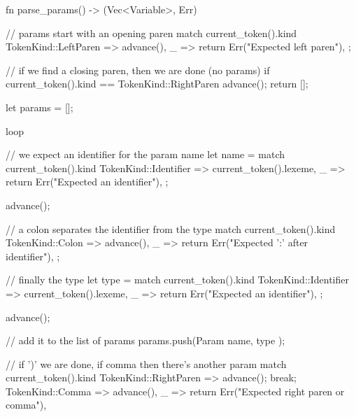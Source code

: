 ﻿\documentclass{article}
\begin{document}
                \begin{code}
                    fn parse_params() -> (Vec<Variable>, Err) {
                        // params start with an opening paren
                        match current_token().kind {
                            TokenKind::LeftParen => advance(),
                            _ => return Err("Expected left paren"),
                        };

                        // if we find a closing paren, then we are done (no params)
                        if current_token().kind == TokenKind::RightParen {
                            advance();
                            return [];
                        }

                        let params = [];

                        loop {
                            // we expect an identifier for the param name
                            let name = match current_token().kind {
                                TokenKind::Identifier => current_token().lexeme,
                                _ => return Err("Expected an identifier"),
                            };

                            advance();

                            // a colon separates the identifier from the type
                            match current_token().kind {
                                TokenKind::Colon => advance(),
                                _ => return Err("Expected ':' after identifier"),
                            };

                            // finally the type
                            let type = match current_token().kind {
                                TokenKind::Identifier => current_token().lexeme,
                                _ => return Err("Expected an identifier"),
                            };

                            advance();

                            // add it to the list of params
                            params.push(Param { name, type });

                            // if ')' we are done, if comma then there's another param
                            match current_token().kind {
                                TokenKind::RightParen => {
                                    advance();
                                    break;
                                }
                                TokenKind::Comma => advance(),
                                _ => return Err("Expected right paren or comma"),
                            }
                        }
                    }
                \end{code}
\end{document}
